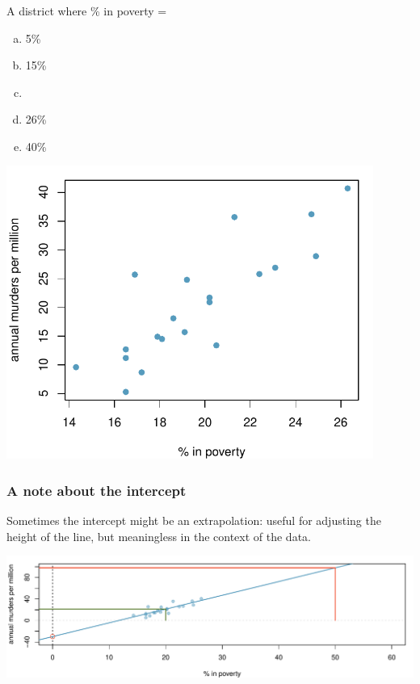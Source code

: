 \documentclass[slidestop,compress,mathserif,12pt,t,professionalfonts,xcolor=table]{beamer}
\newcommand{\solnMult}[1]{
\only<1>{#1}
\only<2->{\red{\textbf{#1}}}
}
\begin{document}
\begin{frame}
\frametitle{}


{
A district where \% in poverty =
\begin{enumerate}[(a)]
\item 5\%
\item 15\%
\item \solnMult{20\%}
\item 26\%
\item 40\%
\end{enumerate}
}
{
\begin{center}
\includegraphics[width=0.9\textwidth]{figures/murder/annual_murders_per_mil_perc_pov}
\end{center}
}

\end{frame}


\begin{frame}
\frametitle{A note about the intercept}

Sometimes the intercept might be an extrapolation: useful for adjusting the height of the line, but meaningless in the context of the data.

\begin{center}
\includegraphics[width=\textwidth]{figures/murder/annual_murders_per_mil_perc_pov_wide}
\end{center}

\end{frame}
\end{document}
